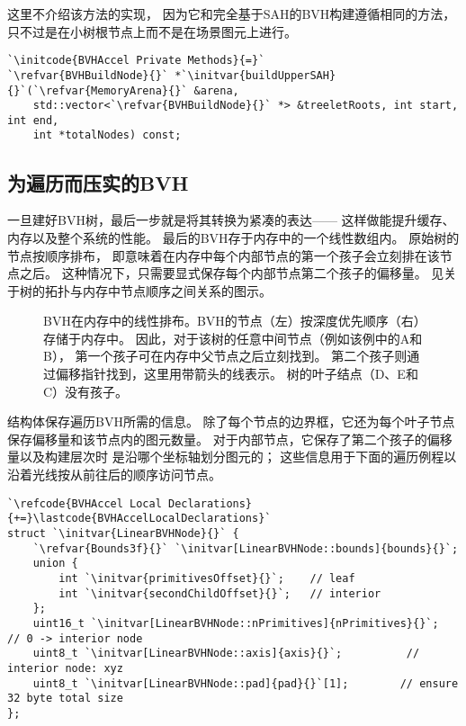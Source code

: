这里不介绍该方法的实现，
因为它和完全基于SAH的BVH构建遵循相同的方法，
只不过是在小树根节点上而不是在场景图元上进行。
\begin{lstlisting}
`\initcode{BVHAccel Private Methods}{=}`
`\refvar{BVHBuildNode}{}` *`\initvar{buildUpperSAH}{}`(`\refvar{MemoryArena}{}` &arena,
    std::vector<`\refvar{BVHBuildNode}{}` *> &treeletRoots, int start, int end,
    int *totalNodes) const;
\end{lstlisting}

\subsection{为遍历而压实的BVH}\label{sub:为遍历而压实的BVH}
一旦建好BVH树，最后一步就是将其转换为紧凑的表达——
这样做能提升缓存、内存以及整个系统的性能。
最后的BVH存于内存中的一个线性数组内。
原始树的节点按顺序排布，
即意味着在内存中每个内部节点的第一个孩子会立刻排在该节点之后。
这种情况下，只需要显式保存每个内部节点第二个孩子的偏移量。
见关于树的拓扑与内存中节点顺序之间关系的图示。
\begin{figure}[htbp]
    \centering
    \caption{BVH在内存中的线性排布。BVH的节点（左）按深度优先顺序（右）存储于内存中。
        因此，对于该树的任意中间节点（例如该例中的A和B），
        第一个孩子可在内存中父节点之后立刻找到。
        第二个孩子则通过偏移指针找到，这里用带箭头的线表示。
        树的叶子结点（D、E和C）没有孩子。}
    \label{fig:4.13}
\end{figure}

结构体保存遍历BVH所需的信息。
除了每个节点的边界框，它还为每个叶子节点保存偏移量和该节点内的图元数量。
对于内部节点，它保存了第二个孩子的偏移量以及构建层次时
是沿哪个坐标轴划分图元的；
这些信息用于下面的遍历例程以沿着光线按从前往后的顺序访问节点。
\begin{lstlisting}
`\refcode{BVHAccel Local Declarations}{+=}\lastcode{BVHAccelLocalDeclarations}`
struct `\initvar{LinearBVHNode}{}` {
    `\refvar{Bounds3f}{}` `\initvar[LinearBVHNode::bounds]{bounds}{}`;
    union {
        int `\initvar{primitivesOffset}{}`;    // leaf
        int `\initvar{secondChildOffset}{}`;   // interior
    };
    uint16_t `\initvar[LinearBVHNode::nPrimitives]{nPrimitives}{}`;  // 0 -> interior node
    uint8_t `\initvar[LinearBVHNode::axis]{axis}{}`;          // interior node: xyz
    uint8_t `\initvar[LinearBVHNode::pad]{pad}{}`[1];        // ensure 32 byte total size
};
\end{lstlisting}

